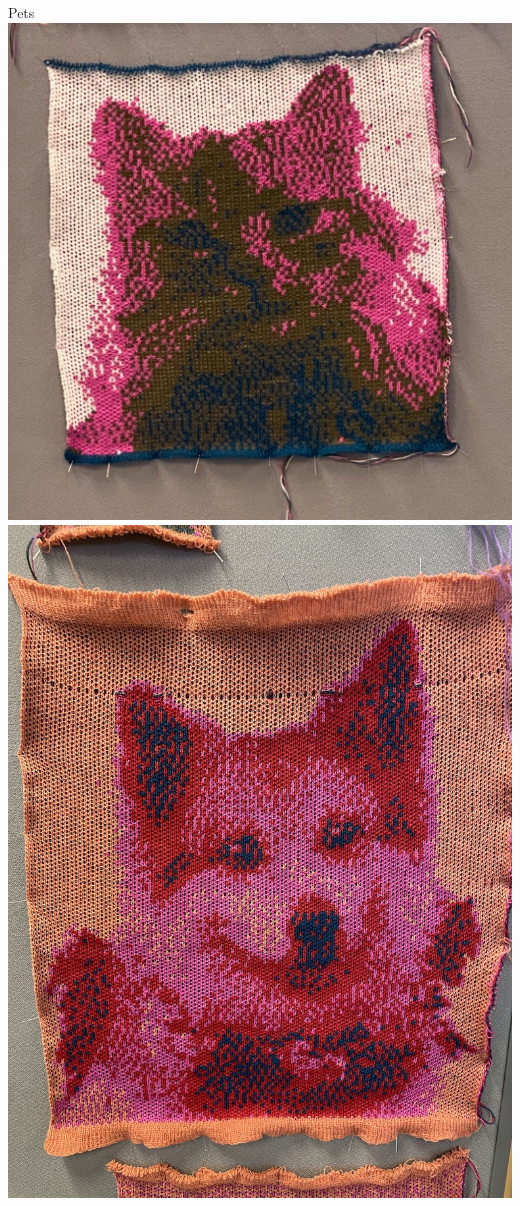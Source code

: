 \documentclass[
    NAME={Dr. Helga Ingimundardóttir},
    EMAIL={helgaingim@hi.is},
    FACULTY={Industrial Engineering},
    TITLE={HiDef Textiles: Reviving Tradition with Innovation},
    SUBTITLE={Empowering Creativity and Sustainability in Textile Production through Digital Transformation},
    SEMINAR={Reykjavík DataBeers},
    DATE={January 25, 2025},
    WIDE={true}
]{HI-LaTeX/hi-beamer}
\begin{document}
    \begin{frame}{Pets}
        \centering
        \includegraphics[height=.7\textheight]{include/kisa.png}
        \hspace{24pt}
        \includegraphics[height=.7\textheight]{include/hundur.jpg}

    \end{frame}
\end{document}
